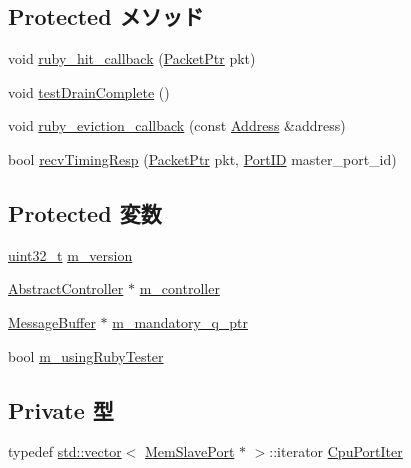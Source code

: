 \subsection*{Protected メソッド}
\begin{DoxyCompactItemize}
\item 
void \hyperlink{classRubyPort_aa8ad1a5d600c338dcd76fcf434f3169e}{ruby\_\-hit\_\-callback} (\hyperlink{classPacket}{PacketPtr} pkt)
\item 
void \hyperlink{classRubyPort_ada43967d9f25e87e20fa808ff7d88a89}{testDrainComplete} ()
\item 
void \hyperlink{classRubyPort_ac3858f72631784d3e09bba9070f96349}{ruby\_\-eviction\_\-callback} (const \hyperlink{classAddress}{Address} \&address)
\item 
bool \hyperlink{classRubyPort_a47ba09f9a3b3998cac9c14ab596a7515}{recvTimingResp} (\hyperlink{classPacket}{PacketPtr} pkt, \hyperlink{base_2types_8hh_acef4d7d41cb21fdc252e20c04cd7bb8e}{PortID} master\_\-port\_\-id)
\end{DoxyCompactItemize}
\subsection*{Protected 変数}
\begin{DoxyCompactItemize}
\item 
\hyperlink{Type_8hh_a435d1572bf3f880d55459d9805097f62}{uint32\_\-t} \hyperlink{classRubyPort_a0d6124b18fa39209bf51ec6407fa7c0f}{m\_\-version}
\item 
\hyperlink{classAbstractController}{AbstractController} $\ast$ \hyperlink{classRubyPort_a1e7049f2cd244dc3944af370eb3e979a}{m\_\-controller}
\item 
\hyperlink{classMessageBuffer}{MessageBuffer} $\ast$ \hyperlink{classRubyPort_a5bd71d4fde9408a3740efa5d95532c15}{m\_\-mandatory\_\-q\_\-ptr}
\item 
bool \hyperlink{classRubyPort_aad291d9ca2fd5321994e6553b21c530a}{m\_\-usingRubyTester}
\end{DoxyCompactItemize}
\subsection*{Private 型}
\begin{DoxyCompactItemize}
\item 
typedef \hyperlink{classstd_1_1vector}{std::vector}$<$ \hyperlink{classRubyPort_1_1MemSlavePort}{MemSlavePort} $\ast$ $>$::iterator \hyperlink{classRubyPort_a0479a75b096e758f414b419c517de782}{CpuPortIter}
\end{DoxyCompactItemize}
